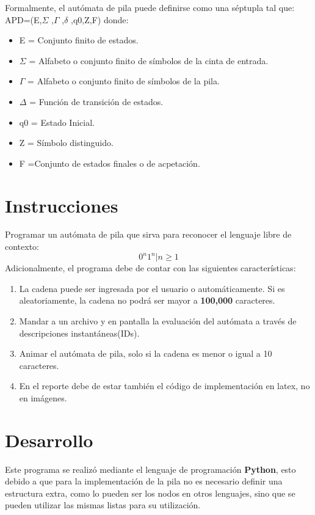 \documentclass{article}
\begin{document}
	Formalmente, el autómata de pila puede definirse como una séptupla tal que: APD=(E,$\Sigma$ ,$\Gamma$ ,$\delta$ ,q0,Z,F) donde:
	
	\begin{itemize}
		\item E = Conjunto finito de estados.
		\item $\Sigma$ = Alfabeto o conjunto finito de símbolos de la cinta de entrada.
		\item $\Gamma$ = Alfabeto o conjunto finito de símbolos de la pila.
		\item $\Delta$ = Función de transición de estados.
		\item q0 = Estado Inicial. 
		\item Z = Símbolo distinguido.
		\item F =Conjunto de estados finales o de acpetación.
		
	


	\end{itemize}
	
	
	
	
	

	\section*{Instrucciones}
	Programar un autómata de pila que sirva para reconocer el lenguaje libre de contexto:\[{{0^{n} 1^{n} | n \geq 1}}\]
	Adicionalmente, el programa debe de contar con las siguientes características:	
	\begin{enumerate}
		\item La cadena puede ser ingresada por el usuario o automáticamente. Si es aleatoriamente, la cadena no podrá ser mayor a \textbf{100,000} caracteres.
		\item Mandar a un archivo y en pantalla la evaluación del autómata a través de descripciones instantáneas(IDs).
		\item Animar el autómata de pila, solo si la cadena es menor o igual a 10 caracteres.
		\item En el reporte debe de estar también el código de implementación en latex, no en imágenes.		
	\end{enumerate}
	\section*{Desarrollo}
	Este programa se realizó mediante el lenguaje de programación \textbf{Python}, esto debido a que para la implementación de la pila no es necesario definir una estructura extra, como lo pueden ser los nodos en otros lenguajes, sino que se pueden utilizar las mismas listas para su utilización. 
	
\end{document}
